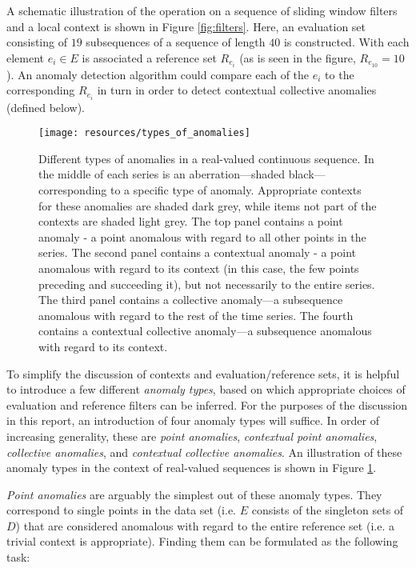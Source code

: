 A schematic illustration of the operation on a sequence of sliding window filters and a local context is shown in Figure \ref{fig:filters}. Here, an evaluation set consisting of $19$ subsequences of a sequence of length $40$ is constructed. With each element $e_i \in E$ is associated a reference set $R_{e_i}$ (as is seen in the figure, $R_{e_{10}} = 10$). An anomaly detection algorithm could compare each of the $e_i$ to the corresponding $R_{e_i}$ in turn in order to detect contextual collective anomalies (defined below).

\begin{figure}[htb]
    \begin{center}
        \texttt{[image: resources/types\_of\_anomalies]}
    \end{center}
    \caption{{\small Different types of anomalies in a real-valued continuous sequence. In the middle of each series is an aberration---shaded black---corresponding to a specific type of anomaly. Appropriate contexts for these anomalies are shaded dark grey, while items not part of the contexts are shaded light grey. The top panel contains a point anomaly - a point anomalous with regard to all other points in the series. The second panel contains a contextual anomaly - a point anomalous with regard to its context (in this case, the few points preceding and succeeding it), but not necessarily to the entire series. The third panel contains a collective anomaly---a subsequence anomalous with regard to the rest of the time series. The fourth contains a contextual collective anomaly---a subsequence anomalous with regard to its context.}}
    \label{fig:anomaly_types}
\end{figure}

To simplify the discussion of contexts and evaluation/reference sets, it is helpful to introduce a few different \emph{anomaly types}, based on which appropriate choices of evaluation and reference filters can be inferred. For the purposes of the discussion in this report, an introduction of four anomaly types will suffice. In order of increasing generality, these are \emph{point anomalies}, \emph{contextual point anomalies}, \emph{collective anomalies}, and \emph{contextual collective anomalies}. An illustration of these anomaly types in the context of real-valued sequences is shown in Figure \ref{fig:anomaly_types}.

\emph{Point anomalies} are arguably the simplest out of these anomaly types. They correspond to single points in the data set (i.e. $E$ consists of the singleton sets of $D$) that are considered anomalous with regard to the entire reference set (i.e. a trivial context is appropriate). Finding them can be formulated as the following task:

